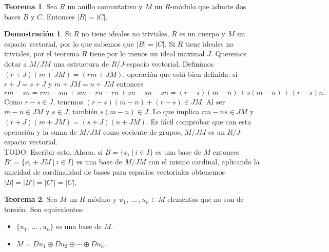 \documentclass[a4paper]{book}
\theoremstyle{definition}
\newtheorem{theorem}{Teorema}[section]
\theoremstyle{ejemplo}
\theoremstyle{demostracion}
\newtheorem{dem}{Demostración}
\begin{document}
\begin{theorem}
	Sea $R$ un anillo conmutativo y $M$ un $R$-módulo que admite dos bases $B$ y $C$. Entonces $|B| = |C|$.
\end{theorem}

\begin{dem}
	Si $R$ no tiene ideales no triviales, $R$ es un cuerpo y $M$ un espacio vectorial, por lo que sabemos que $|B| = |C|$. Si $R$ tiene ideales no triviales, por el teorema $R$ tiene por lo menos un ideal maximal $J$. Queremos dotar a $M/JM$ una estructura de $R/J$-espacio vectorial. Definimos $(r+J)(m+JM) = (rm + JM)$, operación que está bien definida: si $r + J = s + J$ y $m + JM = n + JM$ entonces
	\begin{equation*}
		rm - sn = rm - sm + sm - rn + rn + sn - sn - sn = (r - s)(m - n) + s(m - n) + (r - s)n.
	\end{equation*}
	Como $r - s \in J$, tenemos $(r - s)(m - n) + (r - s) \in JM$. Al ser $m - n \in JM$ y $s \in J$, también $s(m - n) \in J$. Lo que implica $rm - ns \in JM$ y $(r + J)(m + JM) = (s + J)(n + JM)$. Es fácil comprobar que con esta operación y la suma de $M/JM$ como cociente de grupos, $M/JM$ es un $R/J$-espacio vectorial.\\ 
	TODO: Escribir esto.
	Ahora, si $B = \{x_i\ |\ i \in I \}$ es una base de $M$ entonces $B' = \{x_i + JM\ |\ i \in I \}$ es una base de $M/JM$ con el mismo cardinal, aplicando la unicidad de cardinalidad de bases para espacios vectoriales obtenemos $|B| = |B'| = |C'| = |C|$.
\end{dem}
\begin{theorem}
	Sea $M$ un $R$-módulo y $u_1,\ \ldots\ ,u_n \in M$ elementos que no son de torsión. Son equivalentes:
	\begin{itemize}
		\item
		$\{ u_1,\ \dots\ ,u_n\}$ es una base de $M$.
		
		\item
		$M = Du_1 \oplus Du_2 \oplus \cdots \oplus Du_n$.
	\end{itemize}
\end{theorem}
\end{document}
